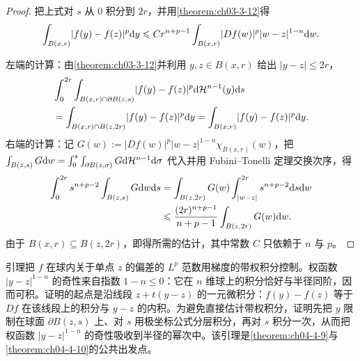 \documentclass[../../main.tex]{subfiles}%
\begin{document}
\begin{proof}
把上式对 $s$ 从 $0$ 积分到 $2r$，并用\cref{theorem:ch03-3-12}得%
\begin{align*}
\int_{B(x,r)}\lvert f(y)-f(z)\rvert^{p}\mathrm{d} y\leqslant C r^{n+p-1}\int_{B(x,r)}\lvert Df(w)\rvert^{p}\lvert w-z\rvert^{1-n}\mathrm{d} w .
\end{align*}

左端的计算：由\cref{theorem:ch03-3-12}并利用 $y,z\in B(x,r)$ 给出 $\lvert y-z\rvert\leqslant 2r$，%
\begin{align*}
&\int_0^{2r}\int_{B(x,r)\cap\partial B(z,s)}\lvert f(y)-f(z)\rvert^{p}\mathrm{d}\mathcal{H}^{n-1}(y)\mathrm{d} s\\
&=\int_{B(x,r)\cap B(z,2r)}\lvert f(y)-f(z)\rvert^{p}\mathrm{d} y
=\int_{B(x,r)}\lvert f(y)-f(z)\rvert^{p}\mathrm{d} y .
\end{align*}
右端的计算：记 $G(w):=\lvert Df(w)\rvert^{p}\lvert w-z\rvert^{1-n}\chi_{B(x,r)}(w)$，把 $\int_{B(z,s)}G\mathrm{d} w=\int_0^{s}\int_{\partial B(z,\sigma)}G\mathrm{d}\mathcal{H}^{n-1}\mathrm{d}\sigma$ 代入并用 Fubini--Tonelli 定理交换次序，得
\begin{align*}
\int_0^{2r}s^{n+p-2}\int_{B(z,s)}G\mathrm{d} w\mathrm{d} s
&=\int_{B(z,2r)}G(w)\int_{\lvert w-z\rvert}^{2r}s^{n+p-2}\mathrm{d} s\mathrm{d} w\\
&\leqslant\frac{(2r)^{n+p-1}}{n+p-1}\int_{B(z,2r)}G(w)\mathrm{d} w .
\end{align*}
由于 $B(x,r)\subseteq B(z,2r)$，即得所需的估计，其中常数 $C$ 只依赖于 $n$ 与 $p$。
\end{proof}

\begin{remark}\label{remark:ch04-lem-4-1-动机}
引理把 $f$ 在球内关于单点 $z$ 的偏差的 $L^{p}$ 范数用梯度的带权积分控制。权函数 $\lvert y-z\rvert^{1-n}$ 的奇性来自指数 $1-n\leqslant0$：它在 $n$ 维球上的积分恰好与半径同阶，因而可积。证明的起点是沿线段 $z+t(y-z)$ 的一元微积分：$f(y)-f(z)$ 等于 $Df$ 在该线段上的积分与 $y-z$ 的内积。为避免直接估计带权积分，证明先把 $y$ 限制在球面 $\partial B(z,s)$ 上、对 $s$ 用极坐标公式分层积分，再对 $s$ 积分一次，从而把权函数 $\lvert y-z\rvert^{1-n}$ 的奇性吸收到半径的幂次中。该引理是\cref{theorem:ch04-4-9}与\cref{theorem:ch04-4-10}的公共出发点。%
\end{remark}
\end{document}
